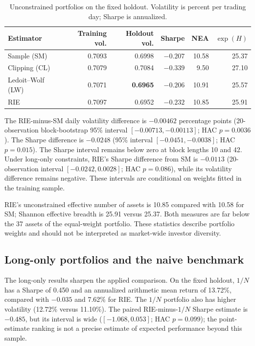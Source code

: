 \documentclass[11pt]{article}
\begin{document}
\begin{table}[ht]
\centering
\caption{Unconstrained portfolios on the fixed holdout. Volatility is percent
per trading day; Sharpe is annualized.}
\label{tab:primary}
\small
\begin{tabular}{lrrrrr}
\toprule
Estimator & Training vol. & Holdout vol. & Sharpe & NEA & $\exp(H)$ \\
\midrule
Sample (SM) & 0.7093 & 0.6998 & $-0.207$ & 10.58 & 25.37 \\
Clipping (CL) & 0.7079 & 0.7084 & $-0.339$ & 9.50 & 27.10 \\
Ledoit--Wolf (LW) & 0.7071 & \textbf{0.6965} & $-0.206$ & 10.91 & 25.57 \\
RIE & 0.7097 & 0.6952 & $-0.232$ & 10.85 & 25.91 \\
\bottomrule
\end{tabular}
\end{table}

The RIE-minus-SM daily volatility difference is $-0.00462$ percentage points
(20-observation block-bootstrap 95\% interval $[-0.00713,-0.00113]$; HAC
$p=0.0036$). The Sharpe difference is $-0.0248$ (95\% interval
$[-0.0451,-0.0038]$; HAC $p=0.015$). The Sharpe interval remains below zero
at block lengths 10 and 42. Under long-only constraints, RIE's Sharpe
difference from SM is $-0.0113$ (20-observation interval
$[-0.0242,0.0028]$; HAC $p=0.086$), while its volatility difference remains
negative. These intervals are conditional on weights fitted in the training
sample.

RIE's unconstrained effective number of assets is 10.85 compared with 10.58
for SM; Shannon effective breadth is 25.91 versus 25.37. Both measures are
far below the 37 assets of the equal-weight portfolio. These statistics
describe portfolio weights and should not be interpreted as market-wide
investor diversity.

\subsection{Long-only portfolios and the naive benchmark}

The long-only results sharpen the applied comparison. On the fixed holdout,
$1/N$ has a Sharpe of 0.450 and an annualized arithmetic mean return of
13.72\%, compared with $-0.035$ and 7.62\% for RIE. The $1/N$ portfolio also
has higher volatility (12.72\% versus 11.10\%). The paired RIE-minus-$1/N$
Sharpe estimate is $-0.485$, but its interval is wide
($[-1.068,0.053]$; HAC $p=0.099$); the point-estimate ranking is not a
precise estimate of expected performance beyond this sample.
\end{document}
